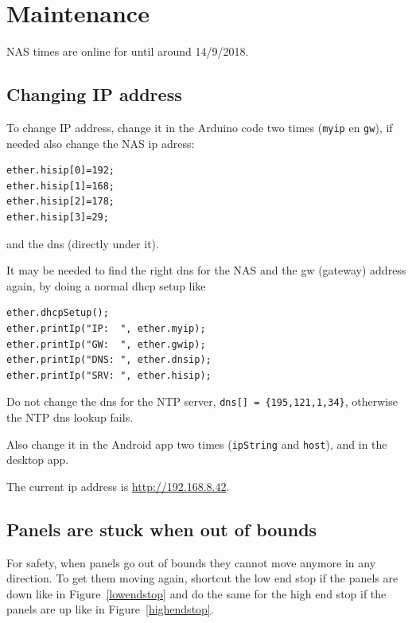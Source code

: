 \documentclass{article}
\begin{document}
	
	\tableofcontents
	\newpage
	
	\section{Maintenance}\label{sec:maintenance}
		NAS times are online for until around 14/9/2018.

		\subsection{Changing IP address}\label{subsec:changingIpAddress}
		
		To change IP address, change it in the Arduino code two times (\verb|myip| en \verb|gw|), if needed also change the NAS ip adress:
		\begin{lstlisting}
ether.hisip[0]=192;
ether.hisip[1]=168;
ether.hisip[2]=178;
ether.hisip[3]=29;
		\end{lstlisting}
		and the dns (directly under it).
		
		It may be needed to find the right dns for the NAS and the gw (gateway) address again, by doing a normal dhcp setup like
		\begin{lstlisting}
ether.dhcpSetup();
ether.printIp("IP:  ", ether.myip);
ether.printIp("GW:  ", ether.gwip);
ether.printIp("DNS: ", ether.dnsip);
ether.printIp("SRV: ", ether.hisip);
		\end{lstlisting}
		Do not change the dns for the NTP server, \verb|dns[] = {195,121,1,34}|, otherwise the NTP dns lookup fails.
		
		Also change it in the Android app two times (\verb|ipString| and \verb|host|), and in the desktop app.
		
		The current ip address is \url{http://192.168.8.42}.

	\subsection{Panels are stuck when out of bounds}\label{subsec:outOfBounds}

	For safety, when panels go out of bounds they cannot move anymore in any direction.
	To get them moving again, shortcut the low end stop if the panels are down like in Figure~\ref{lowendstop} and do the same for the high end stop if the panels are up like in Figure~\ref{highendstop}.
\end{document}

